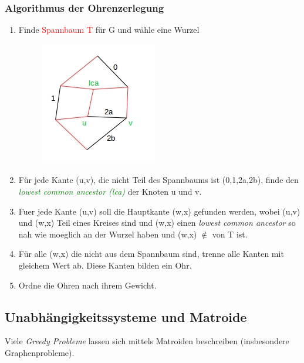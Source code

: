 \subsubsection{Algorithmus der Ohrenzerlegung}
\begin{enumerate}
	\item Finde \textcolor{red}{Spannbaum T} für G und wähle eine Wurzel\\
		\begin{figure}[htp]
		\centering
		\includegraphics[scale=1.00]{lectures/161111/pix/pic2.jpg}
		\end{figure}
	\item Für jede Kante (u,v), die nicht Teil des Spannbaums ist (0,1,2a,2b), finde den \textit{\textcolor{green}{lowest common ancestor (lca)}} der Knoten u und v.
	\item Fuer jede Kante (u,v) soll die Hauptkante (w,x) gefunden werden, wobei (u,v) und (w,x) Teil eines Kreises sind und (w,x) einen \textit{lowest common ancestor} so nah wie moeglich an der Wurzel haben und (w,x) $\notin$ von T ist.
	\item Für alle (w,x) die nicht aus dem Spannbaum sind, trenne alle Kanten mit gleichem Wert ab. Diese Kanten bilden ein Ohr.
	\item Ordne die Ohren nach ihrem Gewicht. 
\end{enumerate}

\newpage
\subsection{Unabhängigkeitssysteme und Matroide}

Viele \textit{Greedy Probleme} lassen sich mittels Matroiden beschreiben (insbesondere Graphenprobleme).

